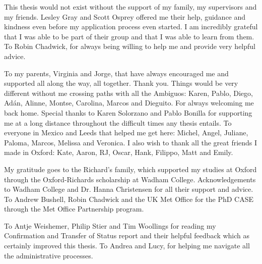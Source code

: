 
This thesis would not exist without the support of my family, my supervisors and my friends. 
Lesley Gray and Scott Osprey offered me their help, guidance and kindness even before my application process even started. I am incredibly grateful that I was able to be part of their group and that I was able to learn from them.
To Robin Chadwick, for always being willing to help me and provide very helpful advice.

To my parents, Virginia and Jorge, that have always encouraged me and supported all along the way, all together. Thank you. 
Things would be very different without me crossing paths with all the Ambiguos: Karen, Pablo, Diego, Adán, Alinne, Montse, Carolina, Marcos and Dieguito. For always welcoming me back home. 
Special thanks to Karen Solorzano and Pablo Bonilla for supporting me at a long distance throughout the difficult times any thesis entails. 
To everyone in Mexico and Leeds that helped me get here: Michel, Angel, Juliane, Paloma, Marcos, Melissa and Veronica. 
 I also wish to thank all the great friends I made in Oxford: Kate, Aaron, RJ, Oscar, Hank, Filippo, Matt and Emily. 

My gratitude goes to the Richard's family, which supported my studies at Oxford through the Oxford-Richards scholarship at Wadham College. Acknowledgements to Wadham College and Dr. Hanna Christensen for all their support and advice. 
To Andrew Bushell, Robin Chadwick and the UK Met Office for the PhD CASE through the Met Office Partnership program. 

To Antje Weishemer, Philip Stier and Tim Woollings for reading my Confirmation and Transfer of Status report and their helpful feedback which as certainly improved this thesis. 
To Andrea and Lucy, for helping me navigate all the administrative processes.


